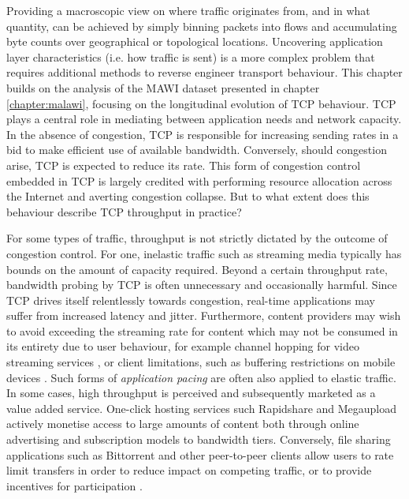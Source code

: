 Providing a macroscopic view on where traffic originates from, and in what quantity, can be achieved by simply binning packets into flows and accumulating byte counts over geographical or topological locations. 
Uncovering application layer characteristics (i.e. how traffic is sent) is a more complex problem that requires additional methods to reverse engineer transport behaviour.
This chapter builds on the analysis of the \ac{MAWI} dataset presented in chapter \ref{chapter:malawi}, focusing on the longitudinal evolution of \ac{TCP} behaviour.
\ac{TCP} plays a central role in mediating between application needs and network capacity.
In the absence of congestion, \ac{TCP} is responsible for increasing sending rates in a bid to make efficient use of available bandwidth.
Conversely, should congestion arise, \ac{TCP} is expected to reduce its rate.
This form of congestion control embedded in \ac{TCP} is largely credited with performing resource allocation across the Internet and averting congestion collapse.
But to what extent does this behaviour describe \ac{TCP} throughput in practice?

For some types of traffic, throughput is not strictly dictated by the outcome of congestion control.
For one, inelastic traffic such as streaming media typically has bounds on the amount of capacity required.
Beyond a certain throughput rate, bandwidth probing by \ac{TCP} is often unnecessary and occasionally harmful.
Since \ac{TCP} drives itself relentlessly towards congestion, real-time applications may suffer from increased latency and jitter.
Furthermore, content providers may wish to avoid exceeding the streaming rate for content which may not be consumed in its entirety due to user behaviour, for example channel hopping for video streaming services \cite{iptvWorkload}, or client limitations, such as buffering restrictions on mobile devices \cite{Rao:2011p547}.
Such forms of \emph{application pacing} are often also applied to elastic traffic.
In some cases, high throughput is perceived and subsequently marketed as a value added service.
One-click hosting services such Rapidshare and Megaupload \cite{oneclick1, SanjuasCuxart:2012p588} actively monetise access to large amounts of content both through online advertising and subscription models to bandwidth tiers.
Conversely, file sharing applications such as Bittorrent and other peer-to-peer clients allow users to rate limit transfers in order to reduce impact on competing traffic, or to provide incentives for participation \cite{bittorrentIMC}.

